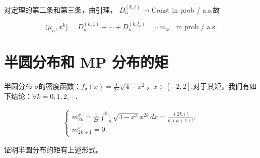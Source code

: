 对定理的第二条和第三条，由引理，
$D_n^{(k,i)} \to \text{Const}$ in prob / a.s.故

\[
\langle \mu_n, x^k \rangle = D_n^{(k,1)} + \cdots + D_n^{(k,l_k)} \implies m_k \quad \text{in prob / a.s.}
\]

\section{半圆分布和 MP 分布的矩}

半圆分布 $\sigma$的密度函数：$f_\sigma(x) = \frac{1}{2\pi} \sqrt{4 - x^2}$，$x \in [-2,2]$.对于其矩，我们有如下结论：$\forall k=0,1,2,\cdots,$

\begin{equation*}
    \begin{aligned}
        \begin{cases}
            m_{2k}^\sigma = \frac{1}{2\pi} \int_{-2}^{2} \sqrt{4 - x^2} x^{2k} \, dx = \frac{(2k)!}{k!(k+1)!},\\
            m_{2k+1}^\sigma = 0.
        \end{cases}
    \end{aligned}
\end{equation*}
\begin{8}
    证明半圆分布的矩有上述形式。
\end{8}
